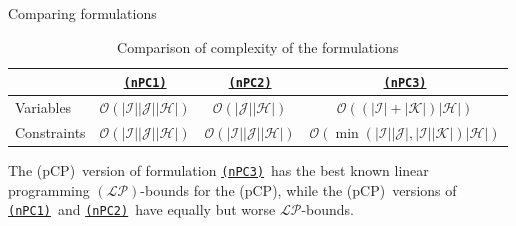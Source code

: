 \documentclass[utf8,aspectratio=169,ngerman,english]{beamer}
\renewcommand{\emph}[1]{\textcolor{jkuGreen}{#1}}
\newcommand{\nPC}{\hyperref[eq:nPC]{\texttt{(nPC1)}}}
\newcommand{\nPCY}{\hyperref[eq:nPCY]{\texttt{(nPC2)}}}
\newcommand{\nPCE}{\hyperref[eq:nPCE]{\texttt{(nPC3)}}}
\newcommand{\pCP}{\emph{(pCP)}}
\begin{document}
\begin{frame}{Comparing formulations}
    \begin{table}[]
        \centering
        \caption{Comparison of complexity of the formulations}
        \label{tab:complexity}
            \begin{tabular}{l|ccc}
                \hline
                            & \nPC                                                      & \nPCY                                                         & \nPCE                                                                                          \\ \hline
                Variables   & $\mathcal O(| \mathcal I || \mathcal J || \mathcal H |)$  & $\mathcal O (| \mathcal J || \mathcal H |)$                   & $\mathcal O ((| \mathcal I | + | \mathcal K |) | \mathcal H |)$                               \\
                Constraints & $\mathcal O(| \mathcal I || \mathcal J || \mathcal H |)$  & $\mathcal O (| \mathcal I || \mathcal J || \mathcal H |)$     & $\mathcal O (\min(| \mathcal I || \mathcal J |,| \mathcal I || \mathcal K |)| \mathcal H |)$  \\ \hline
            \end{tabular}%
    \end{table}\pause
    The \pCP\ version of formulation \nPCE\ has the best known linear programming $(\mathcal{LP})$-bounds for the \pCP, 
    while the \pCP\ versions of \nPC\ and \nPCY\ have equally but worse $\mathcal{LP}$-bounds. 
\end{frame}
\end{document}

